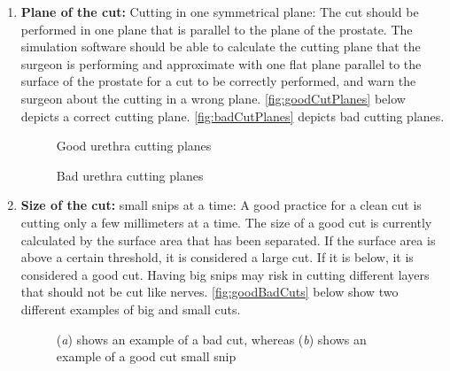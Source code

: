 \begin{enumerate}[start=1,label={Para \#\arabic*, }]
	\item \textbf{Plane of the cut:} Cutting in one symmetrical plane: The cut should be performed in one plane that is parallel to the plane of the prostate. The simulation software should be able to calculate the cutting plane that the surgeon is performing and approximate with one flat plane parallel to the surface of the prostate for a cut to be correctly performed, and warn the surgeon about the cutting in a wrong plane. \autoref{fig:goodCutPlanes} below depicts a correct cutting plane. \autoref{fig:badCutPlanes} depicts bad cutting planes.

\begin{figure}
  \centering
  \qquad\qquad
  \caption{Good urethra cutting planes}\label{fig:goodCutPlanes}
\end{figure}

\begin{figure}
  \centering
  \qquad\qquad
  \caption{Bad urethra cutting planes}\label{fig:badCutPlanes}
\end{figure}

	\item \textbf{Size of the cut:} small snips at a time: A good practice for a clean cut is cutting only a few millimeters at a time. The size of a good cut is currently calculated by the surface area that has been separated.  If the surface area is above a certain threshold, it is considered a large cut. If it is below, it is considered a good cut. Having big snips may risk in cutting different layers that should not be cut like nerves. \autoref{fig:goodBadCuts} below show two different examples of big and small cuts.

\begin{figure}
  \centering
  \qquad\qquad
  \caption{(\emph{a}) shows an example of a bad cut, whereas (\emph{b}) shows an example of a good cut \ie small snip}\label{fig:goodBadCuts}
\end{figure}


\end{enumerate}
